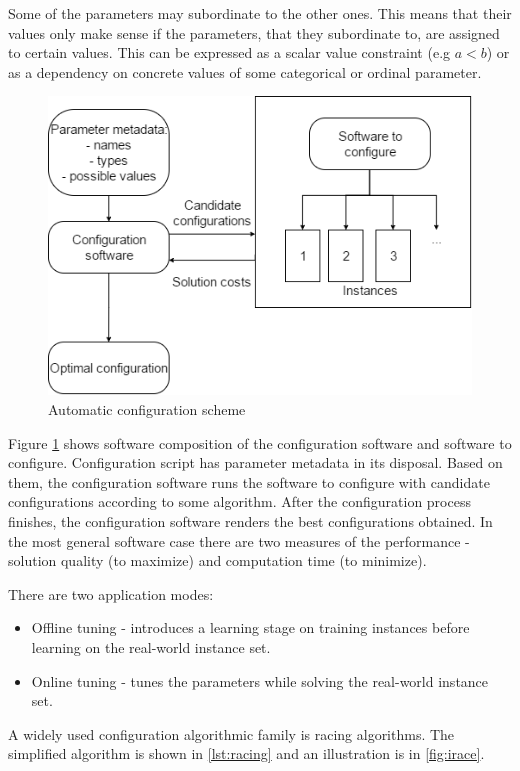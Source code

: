 \documentclass[12pt]{article}
\begin{document}
Some of the parameters may subordinate to the other ones. This means that their values only make sense if the parameters, that they subordinate to, are assigned to certain values. This can be expressed as a scalar value constraint (e.g $a < b$) or as a dependency on concrete values of some categorical or ordinal parameter.

\begin{figure}[H]
  \centering
    \includegraphics[scale=0.7]{configuration-top-level.png}
  \caption{Automatic configuration scheme}
  \label{fig:autoconf}
\end{figure}

Figure \ref{fig:autoconf} shows software composition of the configuration software and software to configure. Configuration script has parameter metadata in its disposal. Based on them, the configuration software runs the software to configure with candidate configurations according to some algorithm. After the configuration process finishes, the configuration software renders the best configurations obtained. In the most general software case there are two measures of the performance - solution quality (to maximize) and computation time (to minimize).

There are two application modes:
\begin{itemize}
\item Offline tuning - introduces a learning stage on training instances before learning on the real-world instance set.
\item Online tuning - tunes the parameters while solving the real-world instance set.
\end{itemize}

A widely used configuration algorithmic family is racing algorithms. The simplified algorithm is shown in \ref{lst:racing} and an illustration is in \ref{fig:irace}.
\end{document}

